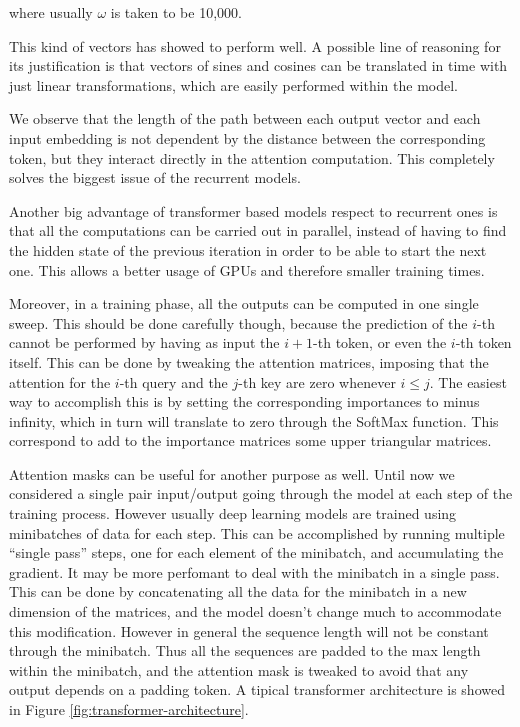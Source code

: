 \documentclass[]{marticle}
\begin{document}
where usually $\omega$ is taken to be 10,000.

This kind of vectors has showed to perform well. A possible line of reasoning for its justification
is that vectors of sines and cosines can be translated in time with just linear transformations,
which are easily performed within the model.

We observe that the length of the path between each output vector and each input embedding is not
dependent by the distance between the corresponding token, but they interact directly in the
attention computation. This completely solves the biggest issue of the recurrent models.

Another big advantage of transformer based models respect to recurrent ones is that all the
computations can be carried out in parallel, instead of having to find the hidden state of the
previous iteration in order to be able to start the next one. This allows a better usage of GPUs and
therefore smaller training times.

Moreover, in a training phase, all the outputs can be computed in one single sweep. This should be
done carefully though, because the prediction of the $i$-th cannot be performed by having as input
the $i+1$-th token, or even the $i$-th token itself. This can be done by tweaking the attention
matrices, imposing that the attention for the $i$-th query and the $j$-th key are zero whenever $i
\leq j$. The easiest way to accomplish this is by setting the corresponding importances to minus
infinity, which in turn will translate to zero through the SoftMax function. This correspond to add
to the importance matrices some upper triangular matrices.

Attention masks can be useful for another purpose as well. Until now we considered a single pair
input/output going through the model at each step of the training process. However usually deep
learning models are trained using minibatches of data for each step. This can be accomplished by
running multiple ``single pass'' steps, one for each element of the minibatch, and accumulating the
gradient. It may be more perfomant to deal with the minibatch in a single pass. This can be done by
concatenating all the data for the minibatch in a new dimension of the matrices, and the model
doesn't change much to accommodate this modification. However in general the sequence length will not
be constant through the minibatch. Thus all the sequences are padded to the max length within the
minibatch, and the attention mask is tweaked to avoid that any output depends on a padding token. A
tipical transformer architecture is showed in Figure \ref{fig:transformer-architecture}.
\end{document}
